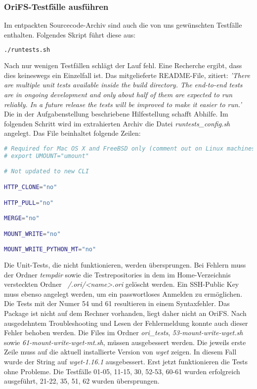 \subsubsection{OriFS-Testfälle ausführen}
\label{subsubsec:OriFS-Testfälle ausführen}
Im entpackten Sourcecode-Archiv sind auch die von uns gewünschten Testfälle enthalten. Folgendes Skript führt diese aus:
\begin{lstlisting}[frame=single, language=bash, caption=Erster Versuch Testfälle]
./runtests.sh
\end{lstlisting}
Nach nur wenigen Testfällen schlägt der Lauf fehl. Eine Recherche ergibt, dass dies keineswegs ein Einzelfall ist. Das mitgelieferte README-File, zitiert: \newline
\textit{'There are multiple unit tests available inside the build directory.  The
end-to-end tests are in ongoing development and only about half of them are
expected to run reliably.  In a future release the tests will be improved to
make it easier to run.'} \newline
\clearpage
Die in der Aufgabenstellung beschriebene Hilfestellung schafft Abhilfe. \cite{OrifsBitbucket} Im folgenden Schritt wird im extrahierten Archiv die Datei \textit{runtests\_config.sh} angelegt. Das File beinhaltet folgende Zeilen:
\begin{lstlisting}[frame=single, language=bash, caption=Inhalt runtests\_config.sh]
# Required for Mac OS X and FreeBSD only (comment out on Linux machines)
# export UMOUNT="umount"

# Not updated to new CLI

HTTP_CLONE="no"

HTTP_PULL="no"

MERGE="no"

MOUNT_WRITE="no"

MOUNT_WRITE_PYTHON_MT="no"
\end{lstlisting}
Die Unit-Tests, die nicht funktionieren, werden übersprungen. Bei Fehlern muss der Ordner \textit{tempdir} sowie die Testrepositories in dem im Home-Verzeichnis versteckten Ordner \textit{~/.ori/<name>.ori} gelöscht werden. Ein SSH-Public Key muss ebenso angelegt werden, um ein passwortloses Anmelden zu ermöglichen. Die Tests mit der Numer 54 und 61 resultieren in einem Syntaxfehler. Das Package ist nicht auf dem Rechner vorhanden, liegt daher nicht an OriFS. Nach ausgedehntem Troubleshooting und Lesen der Fehlermeldung konnte auch dieser Fehler behoben werden. Die Files im Ordner \textit{ori\_tests}, \textit{53-mount-write-wget.sh} sowie \textit{61-mount-write-wget-mt.sh}, müssen ausgebessert werden. Die jeweils erste Zeile muss auf die aktuell installierte Version von \textit{wget} zeigen. In diesem Fall wurde der String auf \textit{wget-1.16.1} ausgebessert. Erst jetzt funktionieren die Tests ohne Probleme. Die Testfälle 01-05, 11-15, 30, 52-53, 60-61 wurden erfolgreich ausgeführt, 21-22, 35, 51, 62 wurden übersprungen.

